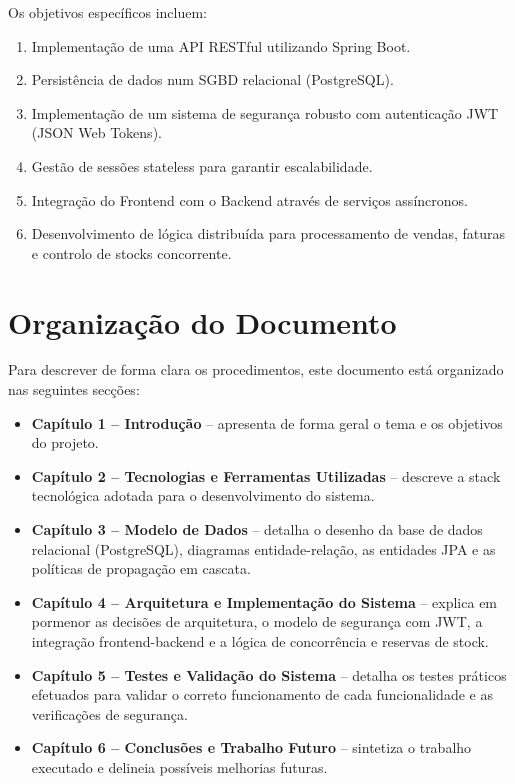 \documentclass[11pt,a4paper,oneside]{report}
\begin{document}
Os objetivos específicos incluem:
\begin{enumerate}
    \item Implementação de uma API RESTful utilizando Spring Boot.
    \item Persistência de dados num SGBD relacional (PostgreSQL).
    \item Implementação de um sistema de segurança robusto com autenticação JWT (JSON Web Tokens).
    \item Gestão de sessões stateless para garantir escalabilidade.
    \item Integração do Frontend com o Backend através de serviços assíncronos.
    \item Desenvolvimento de lógica distribuída para processamento de vendas, faturas e controlo de stocks concorrente.
\end{enumerate}

\section{Organização do Documento}
Para descrever de forma clara os procedimentos, este documento está organizado nas seguintes secções:
\begin{itemize}
    \item \textbf{Capítulo 1 -- Introdução} -- apresenta de forma geral o tema e os objetivos do projeto.
    \item \textbf{Capítulo 2 -- Tecnologias e Ferramentas Utilizadas} -- descreve a stack tecnológica adotada para o desenvolvimento do sistema.
    \item \textbf{Capítulo 3 -- Modelo de Dados} -- detalha o desenho da base de dados relacional (PostgreSQL), diagramas entidade-relação, as entidades JPA e as políticas de propagação em cascata.
    \item \textbf{Capítulo 4 -- Arquitetura e Implementação do Sistema} -- explica em pormenor as decisões de arquitetura, o modelo de segurança com JWT, a integração frontend-backend e a lógica de concorrência e reservas de stock.
    \item \textbf{Capítulo 5 -- Testes e Validação do Sistema} -- detalha os testes práticos efetuados para validar o correto funcionamento de cada funcionalidade e as verificações de segurança.
    \item \textbf{Capítulo 6 -- Conclusões e Trabalho Futuro} -- sintetiza o trabalho executado e delineia possíveis melhorias futuras.
\end{itemize}
\end{document}

